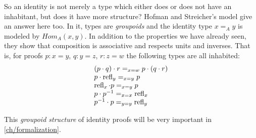 So an identity is not merely a type which either does or does not have an
inhabitant, but does it have more structure?
Hofman and Streicher's model give an answer here too. In it, types are \emph{groupoids} and the
identity type $x =_A y$ is modeled by $Hom_A(x, y)$. In addition to the
properties we have already seen, they show that composition is associative and
respects units and inverses. That is, for proofs $p : x = y$, $q : y = z$, $r :
z = w$ the following types are all inhabited:
\begin{equation*}
\begin{array}{l}
  (p \cdot q) \cdot r =_{x = w} p \cdot (q \cdot r)\\
  p \cdot \operatorname{refl}_y =_{x = y} p\\
  \operatorname{refl}_x \cdot p =_{x = y} p\\
  p \cdot p^{-1} =_{x = x} \operatorname{refl}_x\\
  p^{-1} \cdot p =_{y = y} \operatorname{refl}_y
\end{array}
\end{equation*}

This \emph{groupoid structure} of identity proofs will be very important in \autoref{ch/formalization}.
